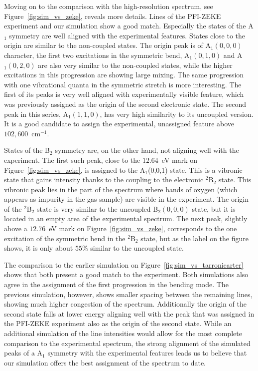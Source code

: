 \documentclass[
12pt,
a4paper,
prb,
superscriptaddress,
]{revtex4}
\begin{document}
Moving on to the comparison with the high-resolution spectrum, see
Figure~\ref{fig:sim_vs_zeke}, reveals more details. Lines of the PFI-ZEKE
experiment and our simulation show a good match. Especially the states of the
A$_1$ symmetry are well aligned with the experimental features. States close
to the origin are similar to the non-coupled states. The origin peak is of
A$_1(0,0,0)$ character, the first two excitations in the symmetric bend,
A$_1(0,1,0)$ and A$_1(0,2,0)$ are also very similar to the non-coupled states,
while the higher excitations in this progression are showing large mixing. The
same progression with one vibrational quanta in the symmetric stretch is more
interesting. The first of its peaks is very well aligned with experimentally
visible feature, which was previously assigned as the origin of the second
electronic state. The second peak in this series, A$_1(1,1,0)$, has very high
similarity to its uncoupled version. It is a good candidate to assign the
experimental, unassigned feature above $102,600$~cm$^{-1}$.

States of the B$_2$ symmetry are, on the other hand, not aligning well with
the experiment. The first such peak, close to the $12.64$~eV mark on
Figure~\ref{fig:sim_vs_zeke}, is assigned to the A$_1$(0,0,1) state.  This is
a vibronic state that gains intensity thanks to the coupling to the electronic
$^2$B$_2$ state. This vibronic peak lies in the part of the spectrum where
bands of oxygen (which appears as impurity in the gas sample) are visible in
the experiment. The origin of the $^2$B$_2$ state is very similar to the
uncoupled B$_2(0,0,0)$ state, but it is located in an empty area of the
experimental spectrum. The next peak, slightly above a $12.76$~eV mark on
Figure~\ref{fig:sim_vs_zeke}, corresponds to the one excitation of the
symmetric bend in the $^2$B$_2$ state, but as the label on the figure shows,
it is only about $55$\% similar to the uncoupled state.

The comparison to the earlier simulation on
Figure~\ref{fig:sim_vs_tarronicarter} shows that both present a good match to
the experiment. Both simulations also agree in the assignment of the first
progression in the bending mode. The previous simulation, however, shows
smaller spacing between the remaining lines, showing much higher congestion of
the spectrum. Additionally the origin of the second state falls at lower
energy aligning well with the peak that was assigned in the PFI-ZEKE
experiment also as the origin of the second state. While an additional
simulation of the line intensities would allow for the most complete
comparison to the experimental spectrum, the strong alignment of the simulated
peaks of a A$_1$ symmetry with the experimental features leads us to
believe that our simulation offers the best assignment of the spectrum to
date.
\end{document}
